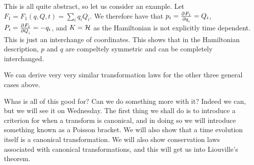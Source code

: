 \documentclass[../PHYS306Notes.tex]{subfiles}
\begin{document}
\noindent This is all quite abstract, so let us consider an example. Let $F_1 = F_1(q, Q, t) = \sum_i q_iQ_i$. We therefore have that $p_i = \pd{F_1}{q_i} = Q_i$, $P_i = \pd{F_1}{Q_i} = - q_i$, and $K = \mathcal{H}$ as the Hamiltonian is not explicitly time dependent. This is just an interchange of coordinates. This shows that in the Hamiltonian description, $p$ and $q$ are compeltely symmetric and can be completely interchanged. 

\noindent We can derive very very similar transformation laws for the other three general cases above.

\noindent Whas is all of this good for? Can we do something more with it? Indeed we can, but we will see it on Wednesday. The first thing we shall do is to introduce a criterion for when a transform is canonical, and in doing so we will introduce something known as a Poisson bracket. We will also show that a time evolution itself is a canonical transformation. We will also show conservation laws associated with canonical transformations, and this will get us into Liouville's theorem. 
\end{document}
